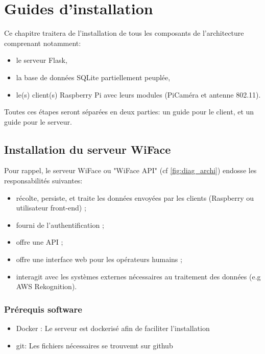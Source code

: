 \chapter{Guides d'installation}
\label{ch:guide_installation}

Ce chapitre traitera de l'installation de tous les composants de l'architecture comprenant notamment: 
\begin{itemize}
    \item le serveur Flask,
    \item la base de données SQLite partiellement peuplée,
    \item le(s) client(s) Raspberry Pi avec leurs modules (PiCaméra et antenne 802.11).
\end{itemize}
Toutes ces étapes seront séparées en deux parties: un guide pour le client, et un guide pour le serveur. 
\section{Installation du serveur WiFace}
Pour rappel, le serveur WiFace ou "WiFace API" (cf \ref{fig:diag_archi}) endosse les responsabilités
suivantes: 
\begin{itemize}
    \item récolte, persiste, et traite les données envoyées par les clients (Raspberry ou utilisateur front-end) ;
    \item fourni de l'authentification ;
    \item offre une API ;
    \item offre une interface web pour les opérateurs humains ;
    \item interagit avec les systèmes externes nécessaires au traitement des données (e.g AWS Rekognition).
\end{itemize}

\subsection{Prérequis software}
\begin{itemize}
    \item Docker : Le serveur est dockerisé afin de faciliter l'installation
    \item git: Les fichiers nécessaires se trouvemt sur github
\end{itemize}

